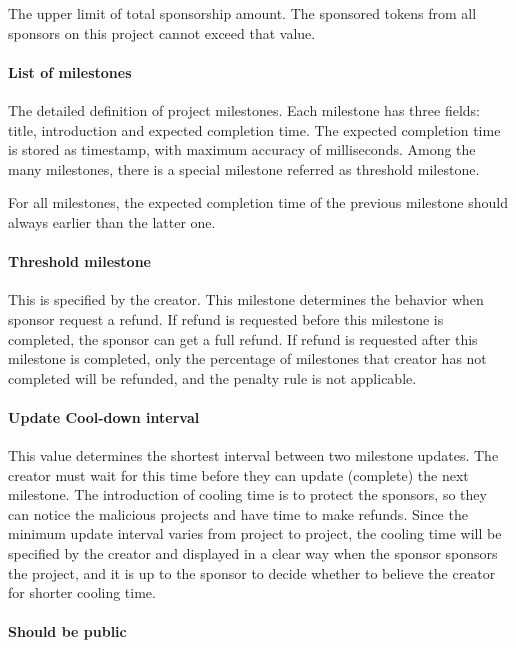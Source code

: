 \documentclass[12pt,a4paper]{article}
\begin{document}
    The upper limit of total sponsorship amount. The sponsored tokens
    from all sponsors on this project cannot exceed that value.

    \paragraph{List of milestones}

    The detailed definition of project milestones.
    Each milestone has three fields: title, introduction and
    expected completion time. The expected completion time
    is stored as timestamp, with maximum accuracy of milliseconds.
    Among the many milestones, there is a special milestone
    referred as threshold milestone.

    For all milestones, the expected completion time of the previous
    milestone should always earlier than the latter one.

    \paragraph{Threshold milestone}

    This is specified by the creator. This milestone determines the
    behavior when sponsor request a refund.
    If refund is requested before this milestone is completed, the sponsor can get a
    full refund. If refund is requested after this milestone is completed,
    only the percentage of milestones that creator has not completed
    will be refunded, and the penalty rule is not applicable.

    \paragraph{Update Cool-down interval}

    This value determines the shortest interval between two milestone updates.
    The creator must wait for this time before they can update (complete)
    the next milestone. The introduction of cooling time is to protect the
    sponsors, so they can notice the malicious projects and have time to make
    refunds. Since the minimum update interval varies from project to project,
    the cooling time will be specified by the creator and displayed in a clear
    way when the sponsor sponsors the project, and it is up to the sponsor to
    decide whether to believe the creator for shorter cooling time.

    \paragraph{Should be public}
\end{document}
